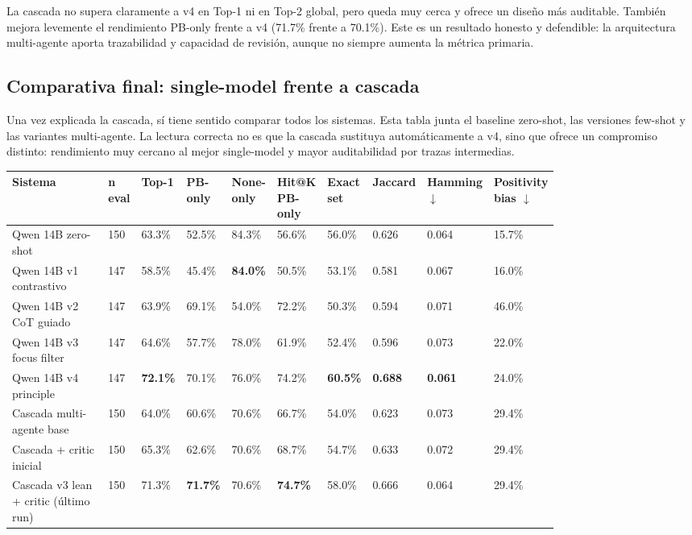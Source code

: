 La cascada no supera claramente a v4 en Top-1 ni en Top-2 global, pero queda muy cerca y ofrece un diseño más auditable. También mejora levemente el rendimiento PB-only frente a v4 (71.7\% frente a 70.1\%). Este es un resultado honesto y defendible: la arquitectura multi-agente aporta trazabilidad y capacidad de revisión, aunque no siempre aumenta la métrica primaria.


\subsection{Comparativa final: single-model frente a cascada}

Una vez explicada la cascada, sí tiene sentido comparar todos los sistemas. Esta tabla junta el baseline zero-shot, las versiones few-shot y las variantes multi-agente. La lectura correcta no es que la cascada sustituya automáticamente a v4, sino que ofrece un compromiso distinto: rendimiento muy cercano al mejor single-model y mayor auditabilidad por trazas intermedias.

\begin{center}
\scriptsize
\setlength{\tabcolsep}{3pt}
\renewcommand{\arraystretch}{1.15}
\begin{tabular}{p{0.22\linewidth}p{0.05\linewidth}p{0.065\linewidth}p{0.065\linewidth}p{0.065\linewidth}p{0.065\linewidth}p{0.065\linewidth}p{0.065\linewidth}p{0.065\linewidth}p{0.065\linewidth}}
\toprule
Sistema & n eval & Top-1 & PB-only & None-only & Hit@K PB-only & Exact set & Jaccard & Hamming $\downarrow$ & Positivity bias $\downarrow$ \\
\midrule
Qwen 14B zero-shot & 150 & 63.3\% & 52.5\% & 84.3\% & 56.6\% & 56.0\% & 0.626 & 0.064 & 15.7\% \\
Qwen 14B v1 contrastivo & 147 & 58.5\% & 45.4\% & \textbf{84.0\%} & 50.5\% & 53.1\% & 0.581 & 0.067 & 16.0\% \\
Qwen 14B v2 CoT guiado & 147 & 63.9\% & 69.1\% & 54.0\% & 72.2\% & 50.3\% & 0.594 & 0.071 & 46.0\% \\
Qwen 14B v3 focus filter & 147 & 64.6\% & 57.7\% & 78.0\% & 61.9\% & 52.4\% & 0.596 & 0.073 & 22.0\% \\
Qwen 14B v4 principle & 147 & \textbf{72.1\%} & 70.1\% & 76.0\% & 74.2\% & \textbf{60.5\%} & \textbf{0.688} & \textbf{0.061} & 24.0\% \\
Cascada multi-agente base & 150 & 64.0\% & 60.6\% & 70.6\% & 66.7\% & 54.0\% & 0.623 & 0.073 & 29.4\% \\
Cascada + critic inicial & 150 & 65.3\% & 62.6\% & 70.6\% & 68.7\% & 54.7\% & 0.633 & 0.072 & 29.4\% \\
Cascada v3 lean + critic (último run) & 150 & 71.3\% & \textbf{71.7\%} & 70.6\% & \textbf{74.7\%} & 58.0\% & 0.666 & 0.064 & 29.4\% \\
\bottomrule
\end{tabular}
\end{center}

